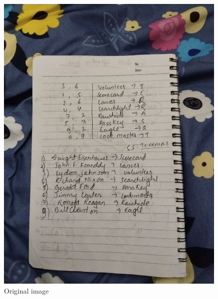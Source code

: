\begin{enumerate}
\begin{figure}[h]
\begin{minipage}[b]{0.30\linewidth}
            \includegraphics[width=\linewidth]{output/original.jpg}
            \caption{Original image}
        \end{minipage}
        \hspace{3cm}
        \begin{minipage}[b]{0.30\linewidth}

\end{minipage}
\end{figure}
\end{enumerate}
